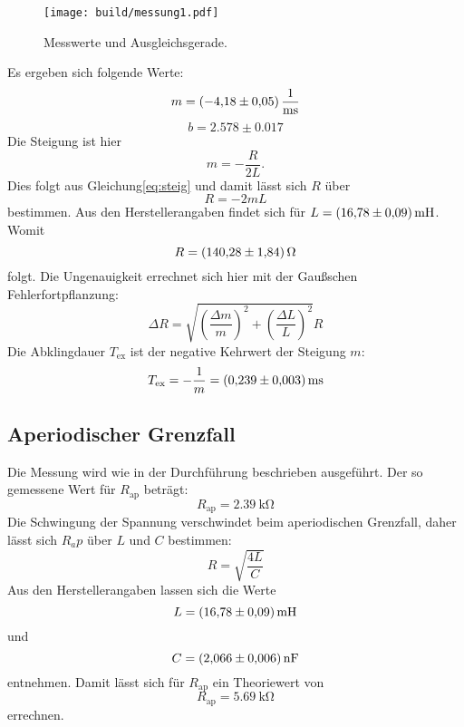 \begin{figure}
    \centering
    \texttt{[image: build/messung1.pdf]}
    \caption{Messwerte und Ausgleichsgerade.}
    \label{fig:plot1}
\end{figure}
Es ergeben sich folgende Werte:
\begin{equation*}
  m=\SI{-4.18\pm0.05}{\per\milli\second}
\end{equation*}
\begin{equation*}
  b=2.578\pm0.017
\end{equation*}
Die Steigung ist hier
\begin{equation*}
  m=-\frac{R}{2L}.
\end{equation*}
Dies folgt aus Gleichung\eqref{eq:steig} und damit lässt sich $R$ über
\begin{equation*}
  R=-2mL
\end{equation*}
bestimmen.
Aus den Herstellerangaben findet sich für $L=\SI{16.78\pm0.09}{\milli\henry}$.
Womit
\begin{equation*}
  R=\SI{140.28\pm1.84}{\ohm}
\end{equation*}
folgt.
Die Ungenauigkeit errechnet sich hier mit der Gaußschen Fehlerfortpflanzung:
\begin{equation*}
  \Delta R= \sqrt{(\frac{\Delta m}{m})^2 + (\frac{\Delta L}{L})^2} R
\end{equation*}
Die Abklingdauer $T_\text{ex}$ ist der negative Kehrwert der Steigung $m$:
\begin{equation*}
  T_\text{ex}= -\frac{1}{m} = \SI{0.239\pm0.003}{\milli\second}
\end{equation*}


\subsection{Aperiodischer Grenzfall}
Die Messung wird wie in der Durchführung beschrieben ausgeführt.
Der so gemessene Wert für $R_\text{ap}$ beträgt:
\begin{equation*}
  R_\text{ap}=\SI{2.39}{\kilo\ohm}
\end{equation*}
Die Schwingung der Spannung verschwindet beim aperiodischen Grenzfall, daher lässt sich $R_ap$ über $L$ und $C$ bestimmen:
\begin{equation*}
  R=\sqrt{\frac{4L}{C}}
\end{equation*}
Aus den Herstellerangaben lassen sich die Werte
\begin{equation*}
  L=\SI{16.78\pm0.09}{\milli\henry}
\end{equation*}
und
\begin{equation*}
  C=\SI{2.066\pm0.006}{\nano\farad}
\end{equation*}
entnehmen.
Damit lässt sich für $R_\text{ap}$ ein Theoriewert von
\begin{equation*}
  R_\text{ap}=\SI{5.69}{\kilo\ohm}
\end{equation*}
errechnen.
